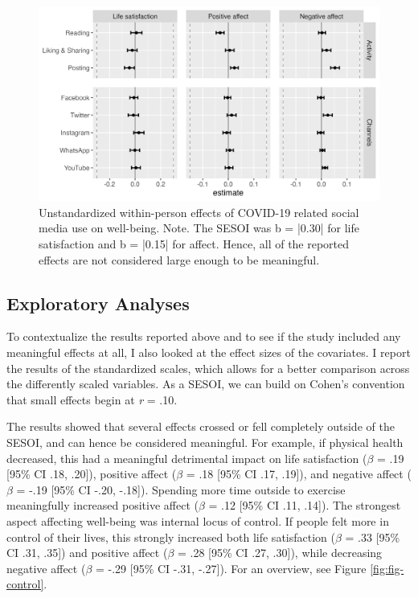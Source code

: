 \documentclass[
  man,mask,floatsintext]{apa7}
\begin{document}
\begin{figure}
\includegraphics[width=\textwidth]{figures/fig_results_within} \caption{Unstandardized within-person effects of COVID-19 related social media use on well-being. Note. The SESOI was b = |0.30| for life satisfaction and b = |0.15| for affect. Hence, all of the reported effects are not considered large enough to be meaningful.}\label{fig:fig-within}
\end{figure}

\subsection{Exploratory Analyses}\label{exploratory-analyses}

To contextualize the results reported above and to see if the study included any meaningful effects at all, I also looked at the effect sizes of the covariates.
I report the results of the standardized scales, which allows for a better comparison across the differently scaled variables.
As a SESOI, we can build on Cohen's convention that small effects begin at \emph{r} = \textbar.10\textbar.

The results showed that several effects crossed or fell completely outside of the SESOI, and can hence be considered meaningful.
For example, if physical health decreased, this had a meaningful detrimental impact on life satisfaction (\(\beta\) = .19 {[}95\% CI .18, .20{]}), positive affect (\(\beta\) = .18 {[}95\% CI .17, .19{]}), and negative affect (\(\beta\) = -.19 {[}95\% CI -.20, -.18{]}).
Spending more time outside to exercise meaningfully increased positive affect (\(\beta\) = .12 {[}95\% CI .11, .14{]}).
The strongest aspect affecting well-being was internal locus of control.
If people felt more in control of their lives, this strongly increased both life satisfaction (\(\beta\) = .33 {[}95\% CI .31, .35{]}) and
positive affect (\(\beta\) = .28 {[}95\% CI .27, .30{]}),
while decreasing negative affect (\(\beta\) = -.29 {[}95\% CI -.31, -.27{]}).
For an overview, see Figure \ref{fig:fig-control}.
\end{document}
